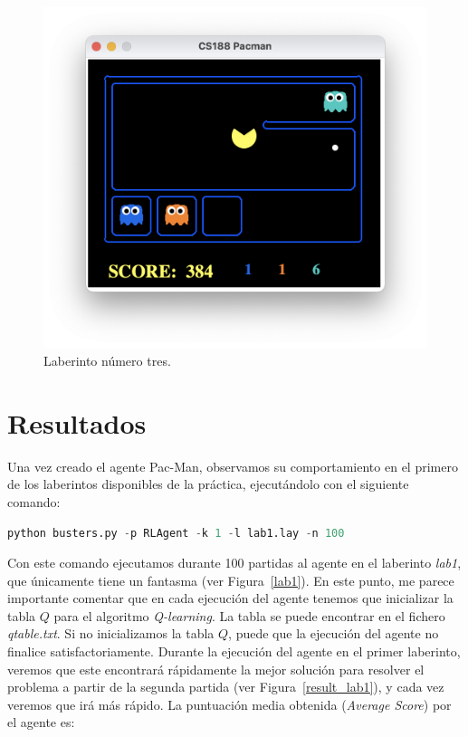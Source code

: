 \documentclass[11pt]{exam}
\begin{document}
\begin{figure}[H]
	\centering
	\includegraphics[scale=0.35]{lab3}
	\caption{Laberinto número tres.}
	\label{lab3}
\end{figure}

\section{Resultados}\label{resultados}

Una vez creado el agente Pac-Man, observamos su comportamiento en el primero de los laberintos disponibles de la práctica, ejecutándolo con el siguiente comando:

\begin{lstlisting}[language=python, basicstyle=\footnotesize]
python busters.py -p RLAgent -k 1 -l lab1.lay -n 100
\end{lstlisting}

Con este comando ejecutamos durante 100 partidas al agente en el laberinto \textit{lab1}, que únicamente tiene un fantasma (ver Figura~\ref{lab1}). En este punto, me parece importante comentar que en cada ejecución del agente tenemos que inicializar la tabla $Q$ para el algoritmo \textit{Q-learning}. La tabla se puede encontrar en el fichero \textit{qtable.txt}. Si no inicializamos la tabla $Q$, puede que la ejecución del agente no finalice satisfactoriamente. Durante la ejecución del agente en el primer laberinto, veremos que este encontrará rápidamente la mejor solución para resolver el problema a partir de la segunda partida (ver Figura~\ref{result_lab1}), y cada vez veremos que irá más rápido. La puntuación media obtenida (\textit{Average Score}) por el agente es:
\end{document}
